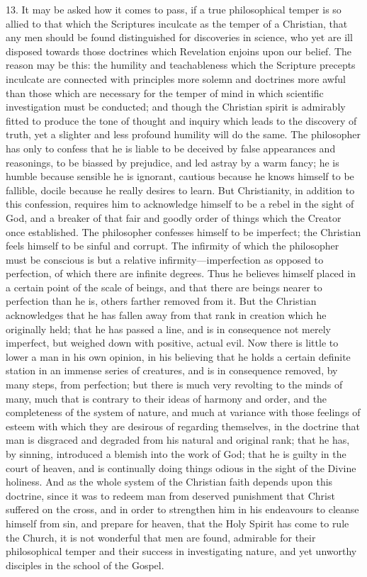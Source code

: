 13. It may be asked how it comes to pass, if a true philosophical
temper is so allied to that which the Scriptures inculcate as the
temper of a Christian, that any men should be found distinguished for
discoveries in science, who yet are ill disposed towards those
doctrines which Revelation enjoins upon our belief. The reason may be
this: the humility and teachableness which the Scripture precepts
inculcate are connected with principles more solemn and doctrines more
awful than those which are necessary for the temper of mind in which
scientific investigation must be conducted; and though the Christian
spirit is admirably fitted to produce the tone of thought and inquiry
which leads to the discovery of truth, yet a slighter and less
profound humility will do the same. The philosopher has only to
confess that he is liable to be deceived by false appearances and
reasonings, to be biassed by prejudice, and led astray by a warm
fancy; he is humble because sensible he is ignorant, cautious because
he knows himself to be fallible, docile because he really desires to
learn. But Christianity, in addition to this confession, requires him
to acknowledge himself to be a rebel in the sight of God, and a
breaker of that fair and goodly order of things which the Creator once
established. The philosopher confesses himself to be imperfect; the
Christian feels himself to be sinful and corrupt. The infirmity of
which the philosopher must be conscious is but a relative infirmity—imperfection
as opposed to perfection, of which there are infinite degrees. Thus he
believes himself placed in a certain point of the scale of beings, and
that there are beings nearer to perfection than he is, others farther
removed from it. But the Christian acknowledges that he has fallen
away from that rank in creation which he originally held; that he has
passed a line, and is in consequence not merely imperfect, but weighed
down with positive, actual evil. Now there is little to lower a man in
his own opinion, in his believing that he holds a certain definite
station in an immense series of creatures, and is in consequence
removed, by many steps, from perfection; but there is much very
revolting to the minds of many, much that is contrary to their ideas
of harmony and order, and the completeness of the system of nature,
and much at variance with those feelings of esteem with which they are
desirous of regarding themselves, in the doctrine that man is
disgraced and degraded from his natural and original rank; that he
has, by sinning, introduced a blemish into the work of God; that he is
guilty in the court of heaven, and is continually doing things odious
in the sight of the Divine holiness. And as the whole system of the
Christian faith depends upon this doctrine, since it was to redeem man
from deserved punishment that Christ suffered on the cross, and in
order to strengthen him in his endeavours to cleanse himself from sin,
and prepare for heaven, that the Holy Spirit has come to rule the
Church, it is not wonderful that men are found, admirable for their
philosophical temper and their success in investigating nature, and
yet unworthy disciples in the school of the Gospel.

